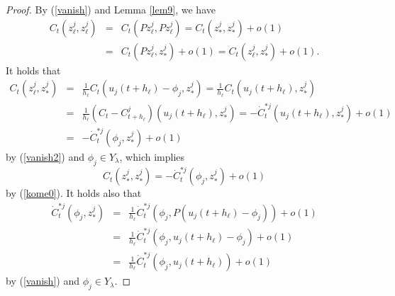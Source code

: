 \documentclass[final,a4paper]{jmsj}
\theoremstyle{thmstyleone}%
\theoremstyle{thmstyletwo}%
\theoremstyle{thmstylethree}%
\begin{document}
\begin{proof} 
By (\ref{vanish}) and Lemma \ref{lem9}, we have  
\begin{eqnarray} 
C_t(z_\ell^j, z_\ell^j) & = & C_t(Pz_\ell^j, Pz_\ell^j)=C_t(z_\ast^j, z_\ast^j)+o(1) \nonumber\\ 
& = & C_t(Pz_\ell^j, z_\ast^j)+o(1)=C_t(z_\ell^j, z_\ast^j)+o(1). 
 \label{kome0}
\end{eqnarray} 
It holds that   
\begin{eqnarray*} 
C_t(z_\ell^j, z_\ast^j) & = & \frac{1}{h_\ell}C_t(u_j(t+h_\ell)-\phi_j, z_\ast^j)=\frac{1}{h_\ell}C_t(u_j(t+h_\ell), z_\ast^j) \\ 
& = & \frac{1}{h_\ell}(C_t-C_{t+h_\ell}^j)(u_j(t+h_\ell), z_\ast^j) = -\dot C_{t}^{\ast j}(u_j(t+h_\ell), z_\ast^j)+o(1) \\ 
& = & -\dot C_{t}^{\ast j}(\phi_j, z_\ast^j)+o(1)  
\end{eqnarray*} 
by (\ref{vanish2}) and $\phi_j\in Y_\lambda$, which implies 
\begin{equation} 
C_t(z_\ast^j, z_\ast^j)=-\dot C_t^{\ast j}(\phi_j, z_\ast^j)+o(1)
 \label{kome}
\end{equation} 
by (\ref{kome0}). It holds also that 
\begin{eqnarray} 
\dot C_{t}^{\ast j}(\phi_j, z_\ast^j) & = & \frac{1}{h_\ell}\dot C_{t}^{\ast j}(\phi_j, P(u_j(t+h_\ell)-\phi_j))+o(1) \nonumber\\ 
& = & \frac{1}{h_\ell}\dot C_{t}^{\ast j}(\phi_j, u_j(t+h_\ell)-\phi_j)+o(1) \nonumber\\ 
& = & \frac{1}{h_\ell}\dot C_{t}^{\ast j}(\phi_j, u_j(t+h_\ell))+o(1) 
 \label{kome2} 
\end{eqnarray} 
by (\ref{vanish}) and $\phi_j\in Y_\lambda$.   


\end{proof}
\end{document}

